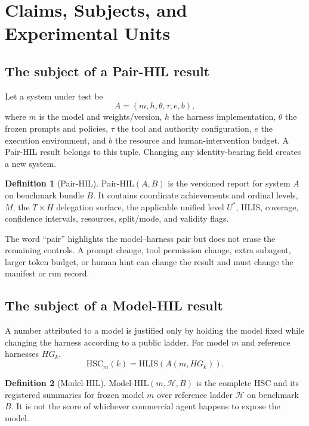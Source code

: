 \documentclass[11pt]{article}
\theoremstyle{definition}
\newtheorem{definition}{Definition}
\newcommand{\HLIS}{\ensuremath{\mathrm{HLIS}}}
\newcommand{\PairHIL}{\ensuremath{\mathrm{Pair\mbox{-}HIL}}}
\newcommand{\ModelHIL}{\ensuremath{\mathrm{Model\mbox{-}HIL}}}
\newcommand{\HSC}{\ensuremath{\mathrm{HSC}}}
\begin{document}
\section{Claims, Subjects, and Experimental Units}\label{sec:units}

\subsection{The subject of a Pair-HIL result}

Let a system under test be
\begin{equation}
A=(m,h,\theta,\tau,e,b),
\end{equation}
where $m$ is the model and weights/version, $h$ the harness implementation, $\theta$ the frozen prompts and policies, $\tau$ the tool and authority configuration, $e$ the execution environment, and $b$ the resource and human-intervention budget. A Pair-HIL result belongs to this tuple. Changing any identity-bearing field creates a new system.

\begin{definition}[Pair-HIL]
\PairHIL$(A,B)$ is the versioned report for system $A$ on benchmark bundle $B$. It contains coordinate achievements and ordinal levels, $M$, the $T\times H$ delegation surface, the applicable unified level $U^*$, HLIS, coverage, confidence intervals, resources, split/mode, and validity flags.
\end{definition}

The word ``pair'' highlights the model--harness pair but does not erase the remaining controls. A prompt change, tool permission change, extra subagent, larger token budget, or human hint can change the result and must change the manifest or run record.

\subsection{The subject of a Model-HIL result}

A number attributed to a model is justified only by holding the model fixed while changing the harness according to a public ladder. For model $m$ and reference harnesses $HG_k$,
\begin{equation}
\HSC_m(k)=\HLIS(A(m,HG_k)).
\end{equation}

\begin{definition}[Model-HIL]
\ModelHIL$(m,\mathcal{H},B)$ is the complete HSC and its registered summaries for frozen model $m$ over reference ladder $\mathcal{H}$ on benchmark $B$. It is not the score of whichever commercial agent happens to expose the model.
\end{definition}
\end{document}
